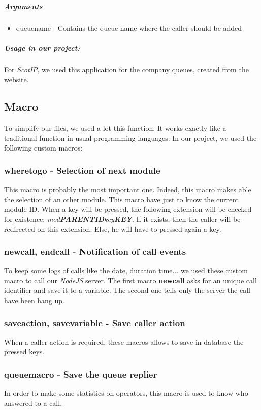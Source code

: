 \subparagraph{Arguments}
\begin{itemize}

	\item queuename - Contains the queue name where the caller should be added
\end{itemize}

\subparagraph{Usage in our project:}
For \textit{ScotIP}, we used this application for the company queues, created from the website.



\subsection{Macro}
To simplify our files, we used a lot this function. It works exactly like a traditional function in usual programming languages. In our project, we used the following custom macros:

\subsubsection{wheretogo - Selection of next module}
This macro is probably the most important one. Indeed, this macro makes able the selection of an other module. This macro have just to know the current module ID. When a key will be pressed, the following extension will be checked for existence: \textit{mod\textbf{PARENTID}key\textbf{KEY}}. If it exists, then the caller will be redirected on this extension. Else, he will have to pressed again a key.

\subsubsection{newcall, endcall - Notification of call events}
To keep some logs of calls like the date, duration time... we used these custom macro to call our \textit{NodeJS} server.
The first macro \textbf{newcall} asks for an unique call identifier and save it to a variable. 
The second one tells only the server the call have been hang up.

\subsubsection{saveaction, savevariable - Save caller action}
When a caller action is required, these macros allows to save in database the pressed keys.

\subsubsection{queuemacro - Save the queue replier}
In order to make some statistics on operators, this macro is used to know who answered to a call.

